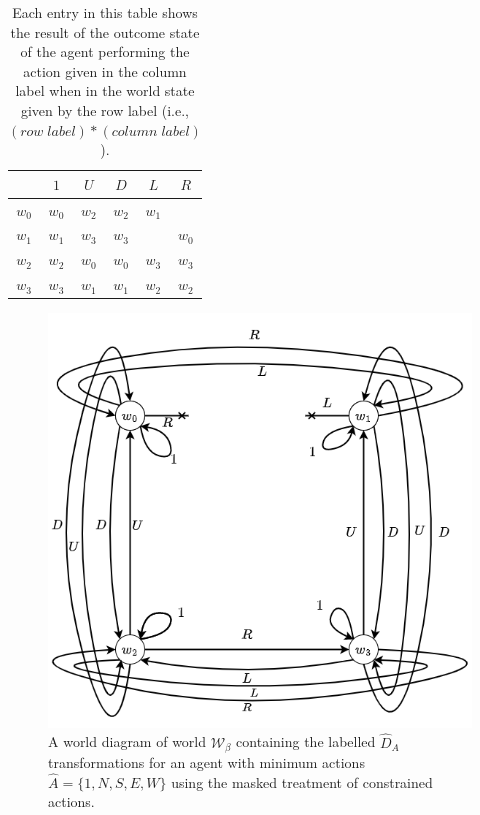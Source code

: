 \begin{table}[H]
    \centering
    \begin{tabular}{c|c c c c c}
                &  $1$      & $U$       & $D$       & $L$               & $R$\\
         \hline
        $w_{0}$ & $w_{0}$   & $w_{2}$   & $w_{2}$   & $w_{1}$           & \bm{$\bot$} \\
        $w_{1}$ & $w_{1}$   & $w_{3}$   & $w_{3}$   & \bm{$\bot$}         & $w_{0}$ \\
        $w_{2}$ & $w_{2}$   & $w_{0}$   & $w_{0}$   & $w_{3}$           & $w_{3}$ \\
        $w_{3}$ & $w_{3}$   & $w_{1}$   & $w_{1}$   & $w_{2}$           & $w_{2}$ \\
    \end{tabular}
    \caption{
    Each entry in this table shows the result of the outcome state of the agent performing the action given in the column label when in the world state given by the row label (i.e., $(row \; label) * (column \; label)$).
    }
    \label{tab:2x2_gridworld_minimum_transformations_wall_masked}
\end{table}

\begin{figure}[H]
    \centering
    \includegraphics[width=0.75\linewidth]{5BeyondSBDRLGlobalAlgebras/Images/masked_walls_2x2_cyclical_min_actions.drawio.png}
    \caption{
    A world diagram of world $\mathscr{W}_{\beta}$ containing the labelled $\hat{D}_{A}$ transformations for an agent with minimum actions $\hat{A} = \{1, N, S, E, W\}$ using the masked treatment of constrained actions.
    }
    \label{fig:2x2_gridworld_minimum_transformations_wall_masked}
\end{figure}

